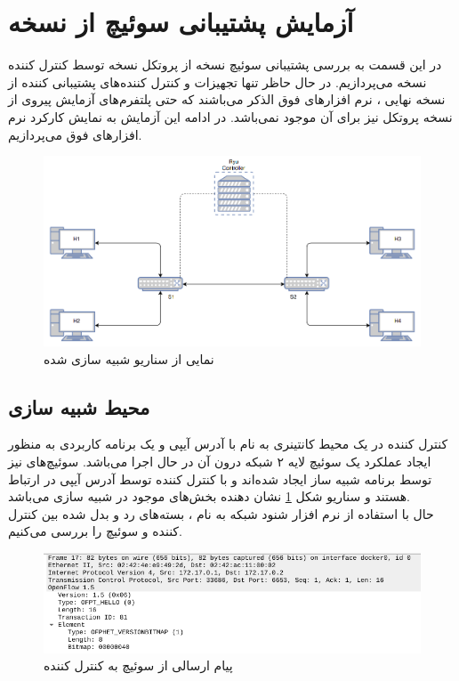 \section{آزمایش پشتیبانی سوئیچ از نسخه }
در این قسمت به بررسی پشتیبانی سوئیچ  نسخه  از پروتکل  نسخه  توسط کنترل کننده  نسخه  می‌پردازیم. در حال حاظر تنها تجهیزات و کنترل کننده‌های پشتیبانی کننده از نسخه نهایی ، نرم افزار‌های فوق الذکر می‌باشند که حتی پلتفرم‌های آزمایش پیروی از نسخه پروتکل نیز برای آن موجود نمی‌باشد. در ادامه این آزمایش به نمایش کارکرد نرم افزار‌‌های فوق می‌پردازیم.

\begin{figure}[H]
	\centering
	\includegraphics[scale=0.4]{imgs/of15_test.png}
	\caption{نمایی از سناریو شبیه سازی شده}
	\label{fig10}
\end{figure}

\subsection{محیط شبیه سازی}
کنترل کننده  در یک محیط کانتینری به نام  با آدرس آيپی  و یک برنامه کاربردی به منظور ایجاد عملکرد یک سوئیچ لایه ۲ شبکه درون آن در حال اجرا می‌باشد. سوئیچ‌های  نیز توسط برنامه شبیه ساز  ایجاد شده‌اند و با  کنترل کننده توسط آدرس آیپی  در ارتباط هستند و سناریو شکل \ref{fig10} نشان دهنده بخش‌های موجود در شبیه سازی می‌باشد.\\
حال با استفاده از نرم افزار شنود شبکه به نام ، بسته‌های رد و بدل شده بین کنترل کننده و سوئیچ را بررسی می‌کنیم.

\begin{figure}
	\centering
	\includegraphics[scale=0.5]{imgs/s_c_hello.png}
	\caption{پیام ارسالی  از سوئیچ به کنترل کننده}
	\label{fig11}
\end{figure}

